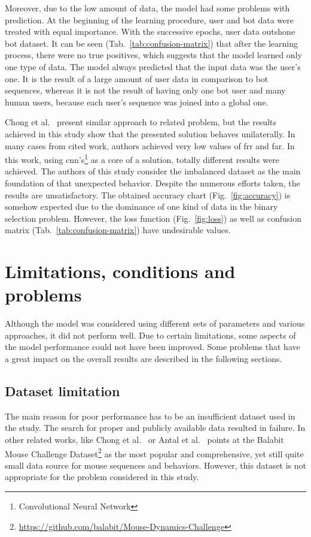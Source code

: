 Moreover, due to the low amount of data, the model had some problems with prediction.
At the beginning of the learning procedure, user and bot data were treated with equal importance.
With the successive epochs, user data outshone bot dataset.
It can be seen \mbox{(Tab.~\ref{tab:confusion-matrix})} that after the learning process, there were no true positives, which suggests that the model learned only one type of data.
The model always predicted that the input data was the user's one.
It is the result of a large amount of user data in comparison to bot sequences, whereas it is not the result of having only one bot user and many human users, because each user's sequence was joined into a global one.

Chong et al.~\cite{Main} present similar approach to related problem, but the results achieved in this study show that the presented solution behaves unilaterally.
In many cases from cited work, authors achieved very low values of \gls{frr} and \gls{far}.
In this work, using \gls{cnn}'s\footnote{Convolutional Neural Network} as a core of a solution, totally different results were achieved.
The authors of this study consider the imbalanced dataset as the main foundation of that unexpected behavior.
Despite the numerous efforts taken, the results are unsatisfactory.
The obtained accuracy chart (Fig.~\ref{fig:accuracy}) is somehow expected due to the dominance of one kind of data in the binary selection problem.
However, the loss function (Fig.~\ref{fig:loss}) as well as confusion matrix (Tab.~\ref{tab:confusion-matrix}) have undesirable values.


\section{Limitations, conditions and problems}\label{sec:limitations-conditions-problems}
Although the model was considered using different sets of parameters and various approaches, it did not perform well.
Due to certain limitations, some aspects of the model performance could not have been improved.
Some problems that have a great impact on the overall results are described in the following sections.

\subsection{Dataset limitation}\label{subsec:dataset-limitation}
The main reason for poor performance has to be an insufficient dataset used in the study.
The search for proper and publicly available data resulted in failure.
In other related works, like Chong et al.~\cite{Main} or Antal et al.~\cite{antal2019intrusion} points at the Balabit Mouse Challenge Dataset\footnote{\url{https://github.com/balabit/Mouse-Dynamics-Challenge}} as the most popular and comprehensive, yet still quite small data source for mouse sequences and behaviors.
However, this dataset is not appropriate for the problem considered in this study.

